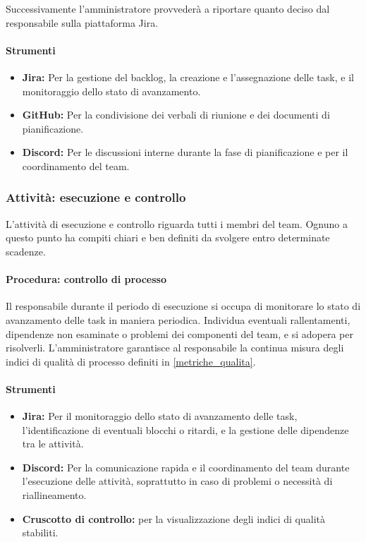 \documentclass[a4paper,12pt]{article}
\begin{document}
Successivamente l'amministratore provvederà a riportare quanto deciso dal
responsabile sulla piattaforma Jira.

\paragraph{Strumenti}
\begin{itemize}
    \item \textbf{Jira:} Per la gestione del backlog, la creazione e l'assegnazione delle task, e il monitoraggio dello stato di avanzamento.
    \item \textbf{GitHub:} Per la condivisione dei verbali di riunione e dei documenti di pianificazione.
    \item \textbf{Discord:} Per le discussioni interne durante la fase di pianificazione e per il coordinamento del team.
\end{itemize}

\subsubsection{Attività: esecuzione e controllo}
L'attività di esecuzione e controllo riguarda tutti i membri del team. Ognuno a
questo punto ha compiti chiari e ben definiti da svolgere entro determinate
scadenze.
\paragraph{Procedura: controllo di processo}
Il responsabile durante il periodo di esecuzione si occupa di monitorare lo
stato di avanzamento delle task in maniera periodica. Individua eventuali
rallentamenti, dipendenze non esaminate o problemi dei componenti del team, e
si adopera per risolverli. L'amministratore garantisce al responsabile la
continua misura degli indici di qualità di processo definiti in
\ref{metriche_qualita}.
\paragraph{Strumenti}
\begin{itemize}
    \item \textbf{Jira:} Per il monitoraggio dello stato di avanzamento delle task, l'identificazione di eventuali blocchi o ritardi, e la gestione delle dipendenze tra le attività.
    \item \textbf{Discord:} Per la comunicazione rapida e il coordinamento del team durante l'esecuzione delle attività, soprattutto in caso di problemi o necessità di riallineamento.
    \item \textbf{Cruscotto di controllo:} per la visualizzazione degli indici di qualità stabiliti.
\end{itemize}
\end{document}
